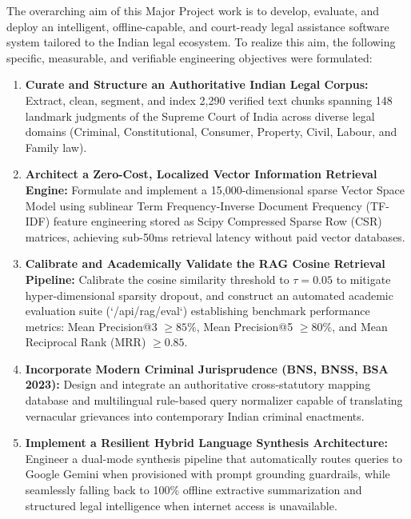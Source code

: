 The overarching aim of this Major Project work is to develop, evaluate, and deploy an intelligent, offline-capable, and court-ready legal assistance software system tailored to the Indian legal ecosystem. To realize this aim, the following specific, measurable, and verifiable engineering objectives were formulated:

\begin{enumerate}
    \item \textbf{Curate and Structure an Authoritative Indian Legal Corpus:}
    Extract, clean, segment, and index 2,290 verified text chunks spanning 148 landmark judgments of the Supreme Court of India across diverse legal domains (Criminal, Constitutional, Consumer, Property, Civil, Labour, and Family law).
    
    \item \textbf{Architect a Zero-Cost, Localized Vector Information Retrieval Engine:}
    Formulate and implement a 15,000-dimensional sparse Vector Space Model using sublinear Term Frequency-Inverse Document Frequency (TF-IDF) feature engineering stored as Scipy Compressed Sparse Row (CSR) matrices, achieving sub-50ms retrieval latency without paid vector databases.
    
    \item \textbf{Calibrate and Academically Validate the RAG Cosine Retrieval Pipeline:}
    Calibrate the cosine similarity threshold to $\tau = 0.05$ to mitigate hyper-dimensional sparsity dropout, and construct an automated academic evaluation suite (`/api/rag/eval`) establishing benchmark performance metrics: Mean Precision@3 $\ge 85\%$, Mean Precision@5 $\ge 80\%$, and Mean Reciprocal Rank (MRR) $\ge 0.85$.
    
    \item \textbf{Incorporate Modern Criminal Jurisprudence (BNS, BNSS, BSA 2023):}
    Design and integrate an authoritative cross-statutory mapping database and multilingual rule-based query normalizer capable of translating vernacular grievances into contemporary Indian criminal enactments.
    
    \item \textbf{Implement a Resilient Hybrid Language Synthesis Architecture:}
    Engineer a dual-mode synthesis pipeline that automatically routes queries to Google Gemini when provisioned with prompt grounding guardrails, while seamlessly falling back to 100\% offline extractive summarization and structured legal intelligence when internet access is unavailable.
    

\end{enumerate}
